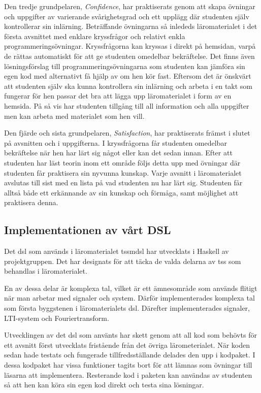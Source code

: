 \documentclass[12pt,a4paper,twoside,openright]{article}
\begin{document}
Den tredje grundpelaren, \textit{Confidence}, har praktiserats genom
att skapa övningar och uppgifter av varierande svårighetsgrad och ett
upplägg där studenten själv kontrollerar sin inlärning. Beträffande
övningarna så inlededs läromaterialet i det första avsnittet med enklare
kryssfrågor och relativt enkla programmeringsövningar. Kryssfrågorna
kan kryssas i direkt på hemsidan, varpå de rättas automatiskt för att ge
studenten omedelbar bekräftelse. Det finns även lösningsförslag till
programmeringsövningarna som studenten kan jämföra sin egen kod med alternativt
få hjälp av om hen kör fast. Eftersom det är önskvärt att studenten själv ska
kunna kontrollera sin inlärning och arbeta i en takt som fungerar för
hen passar det bra att lägga upp läromaterialet i form av en
hemsida. På så vis har studenten tillgång till all information och
alla uppgifter men kan arbeta med materialet som hen vill.

Den fjärde och sista grundpelaren, \textit{Satisfaction}, har
praktiserats främst i slutet på avsnitten och i uppgifterna. I
kryssfrågorna får studenten omedelbar bekräftelse när hen har lärt sig
något eller kan det sedan innan. Efter att studenten har läst teorin
inom ett område följs detta upp med övningar där studenten får
praktisera sin nyvunna kunskap. Varje avsnitt i läromaterialet
avslutas till sist med en lista på vad studenten nu har lärt
sig. Studenten får alltså både ett erkännande av sin kunskap och
förmåga, samt möjlighet att praktisera denna.

\subsection{Implementationen av vårt DSL}
\label{sec:implDSL}
Det \gls{dsl} som används i läromaterialet \gls{tssmdsl} har
utvecklats i Haskell av projektgruppen. Det har designats för att
täcka de valda delarna av \gls{tss} som behandlas i läromaterialet.

En av dessa delar är komplexa tal, vilket är ett ämnesområde som
används flitigt när man arbetar med signaler och system. Därför
implementerades komplexa tal som första byggstenen i läromaterialets
\gls{dsl}. Därefter implementerades signaler, LTI-system och
Fouriertransform.

Utvecklingen av det \gls{dsl} som använts har skett genom att all kod
som behövts för ett avsnitt först utvecklats fristående från det
övriga lärometerialet. När koden sedan hade testats och fungerade
tillfredsställande delades den upp i kodpaket. I dessa kodpaket har
vissa funktioner tagits bort för att lämnas som övningar till läsarna
att implementera. Resterande kod i paketen kan användas av studenten
så att hen kan köra sin egen kod direkt och testa sina lösningar.
\end{document}
